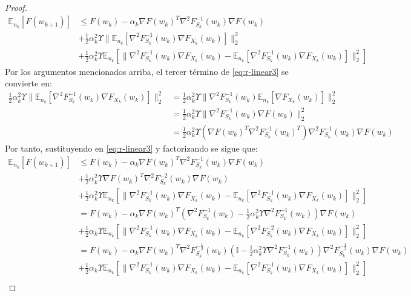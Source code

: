 \documentclass{book}
\theoremstyle{plain}
\theoremstyle{definition}
\theoremstyle{remark}
\begin{document}
\begin{proof}
\begin{equation}
\begin{split}
     \mathbb{E}_{n_k}[F(w_{k+1})] & \leq F(w_{k}) -\alpha_k\nabla F(w_{k})^T\nabla^2F_{S_k}^{-1}(w_k)\nabla F(w_k)\\ & +\frac{1}{2}\alpha^2_k\Upsilon\|\mathbb{E}_{n_k}[\nabla^2F_{S_k}^{-1}(w_k)\nabla F_{X_k}(w_k)]\|_2^2 \\ & + \frac{1}{2}\alpha^2_k\Upsilon\mathbb{E}_{n_k}[\|\nabla^2F_{S_k}^{-1}(w_k)\nabla F_{X_k}(w_k) - \mathbb{E}_{n_k}[\nabla^2F_{S_k}^{-1}(w_k)\nabla F_{X_k}(w_k)]\|_2^2]
\end{split}
\end{equation}
Por los argumentos mencionados arriba, el tercer término de \ref{eq:r-linear3} se convierte en:
\begin{equation*}
\begin{split}
 \frac{1}{2}\alpha^2_k\Upsilon\|\mathbb{E}_{n_k}[\nabla^2F_{S_k}^{-1}(w_k)\nabla F_{X_k}(w_k)]\|_2^2 & = \frac{1}{2}\alpha^2_k\Upsilon\|\nabla^2F_{S_k}^{-1}(w_k)\mathbb{E}_{n_k}[\nabla F_{X_k}(w_k)]\|_2^2 \\
 & = \frac{1}{2}\alpha^2_k\Upsilon\|\nabla^2F_{S_k}^{-1}(w_k)\nabla F(w_k)\|_2^2 \\
 & = \frac{1}{2}\alpha^2_k\Upsilon(\nabla F(w_k)^T\nabla^2F_{S_k}^{-1}(w_k)^T)\nabla^2F_{S_k}^{-1}(w_k)\nabla F(w_k)
\end{split}
\end{equation*}
Por tanto, sustituyendo en \ref{eq:r-linear3} y factorizando se sigue que:
\begin{equation}\label{eq:r-linear4}
\begin{split}
    \mathbb{E}_{n_k}[F(w_{k+1})] &  \leq F(w_{k}) -\alpha_k\nabla F(w_{k})^T\nabla^2F_{S_k}^{-1}(w_k)\nabla F(w_k)\\ & +\frac{1}{2}\alpha^2_k\Upsilon\nabla F(w_k)^T\nabla^2F_{S_k}^{-2}(w_k)\nabla F(w_k) \\ & + \frac{1}{2}\alpha^2_k\Upsilon\mathbb{E}_{n_k}[\|\nabla^2F_{S_k}^{-1}(w_k)\nabla F_{X_k}(w_k) - \mathbb{E}_{n_k}[\nabla^2F_{S_k}^{-1}(w_k)\nabla F_{X_k}(w_k)]\|_2^2] \\
    & =F(w_{k}) -\alpha_k\nabla F(w_{k})^T(\nabla^2F_{S_k}^{-1}(w_k)-\frac{1}{2}\alpha^2_k\Upsilon\nabla^2F_{S_k}^{-1}(w_k))\nabla F(w_k)\\ & + \frac{1}{2}\alpha_k\Upsilon\mathbb{E}_{n_k}[\|\nabla^2F_{S_k}^{-1}(w_k)\nabla F_{X_k}(w_k) - \mathbb{E}_{n_k}[\nabla^2F_{S_k}^{-2}(w_k)\nabla F_{X_k}(w_k)]\|_2^2]\\
     & =F(w_{k}) -\alpha_k\nabla F(w_{k})^T\nabla^2F_{S_k}^{-\frac{1}{2}}(w_k)(\mathbb{I}-\frac{1}{2}\alpha^2_k\Upsilon\nabla^2F_{S_k}^{-1}(w_k))\nabla^2F_{S_k}^{-\frac{1}{2}}(w_k)\nabla F(w_k)\\ & + \frac{1}{2}\alpha_k\Upsilon\mathbb{E}_{n_k}[\|\nabla^2F_{S_k}^{-1}(w_k)\nabla F_{X_k}(w_k) - \mathbb{E}_{n_k}[\nabla^2F_{S_k}^{-1}(w_k)\nabla F_{X_k}(w_k)]\|_2^2]\\

\end{split}
\end{equation}
\end{proof}
\end{document}
